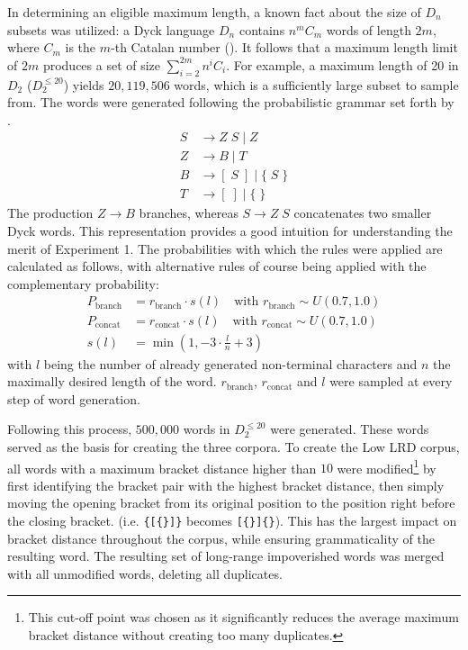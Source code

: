 In determining an eligible maximum length, a known fact about the size of $D_{n}$ subsets was utilized: a Dyck language $D_{n}$ contains $n^mC_{m}$ words of length $2m$, where $C_{m}$ is the $m$-th Catalan number (\cite{Skachkova2018}). It follows that a maximum length limit of $2m$ produces a set of size $\sum_{i=2}^{2m}n^{i}C_{i}$. For example, a maximum length of 20 in $D_{2}$ ($D_{2}^{\leq 20}$) yields $20{,}119{,}506$ words, which is a sufficiently large subset to sample from. The words were generated following the probabilistic grammar set forth by \cite{Sennhauser2018}.
\begin{align*}
	S &\rightarrow Z \; S \; \vert \; Z \\
	Z &\rightarrow B \; \vert \; T \\
	B &\rightarrow [ \; S \; ] \; \vert \; \lbrace \; S \; \rbrace \\
	T &\rightarrow [ \; ] \; \vert \; \lbrace \; \rbrace
\end{align*}
The production $Z \rightarrow B$ branches, whereas $S \rightarrow Z \; S$ concatenates two smaller Dyck words. This representation provides a good intuition for understanding the merit of Experiment 1. The probabilities with which the rules were applied are calculated as follows, with alternative rules of course being applied with the complementary probability:
\begin{align*}
	P_{\text{branch}} &= r_{\text{branch}} \cdot s(l) \quad \text{with } r_{\text{branch}} \sim U(0.7,1.0) \\
	P_{\text{concat}} &= r_{\text{concat}} \cdot s(l) \quad \text{with } r_{\text{concat}} \sim U(0.7,1.0) \\
	s(l) &= \min(1, -3 \cdot \frac{l}{n} + 3)
\end{align*}
with $l$ being the number of already generated non-terminal characters and $n$ the maximally desired length of the word. $r_{\text{branch}}$, $r_{\text{concat}}$ and $l$ were sampled at every step of word generation.

Following this process, $500{,}000$ words in $D_{2}^{\leq 20}$ were generated. These words served as the basis for creating the three corpora. To create the Low LRD corpus, all words with a maximum bracket distance higher than $10$ were modified\footnote{This cut-off point was chosen as it significantly reduces the average maximum bracket distance without creating too many duplicates.} by first identifying the bracket pair with the highest bracket distance, then simply moving the opening bracket from its original position to the position right before the closing bracket. (i.e. \texttt{\{[\{\}]\}} becomes \texttt{[\{\}]\{\}}). This has the largest impact on bracket distance throughout the corpus, while ensuring grammaticality of the resulting word. The resulting set of long-range impoverished words was merged with all unmodified words, deleting all duplicates.

